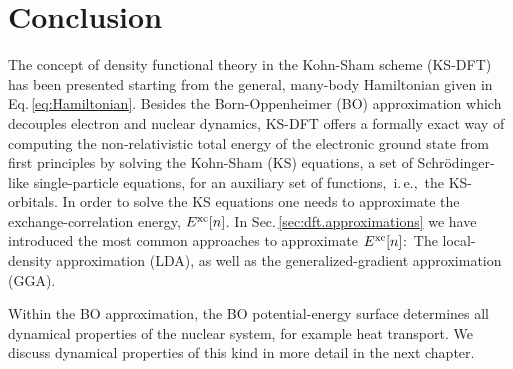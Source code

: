 \section{Conclusion}
The concept of density functional theory in the Kohn-Sham scheme (KS-DFT) has been presented starting from the general, many-body Hamiltonian given in Eq.\,\eqref{eq:Hamiltonian}. Besides the Born-Oppenheimer (BO) approximation which decouples electron and nuclear dynamics, KS-DFT offers a formally exact way of computing the non-relativistic total energy of the electronic ground state from first principles by solving the Kohn-Sham (KS) equations, a set of Schr\"odinger-like single-particle equations, for an auxiliary set of functions,~i.\,e.,~the KS-orbitals. In order to solve the KS equations one needs to approximate the exchange-correlation energy, $E^{\rm xc} [n]$. In Sec.\,\ref{sec:dft.approximations} we have introduced the most common approaches to approximate $E^{\rm xc} [n]$:~The local-density approximation (LDA), as well as the generalized-gradient approximation (GGA).

Within the BO approximation, the BO potential-energy surface determines all dynamical properties of the nuclear system, for example heat transport. We discuss dynamical properties of this kind in more detail in the next chapter.
